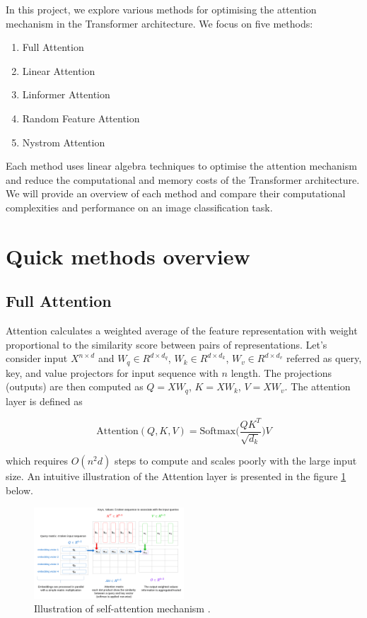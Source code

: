 In this project, we explore various methods for optimising the attention mechanism in the Transformer architecture. We focus on five methods: 
\begin{enumerate}
\item Full Attention
\item Linear Attention
\item Linformer Attention
\item Random Feature Attention
\item Nystrom Attention
\end{enumerate}
Each method uses linear algebra techniques to optimise the attention mechanism and reduce the computational and memory costs of the Transformer architecture. We will provide an overview of each method and compare their computational complexities and performance on an image classification task.


\section{Quick methods overview}

\subsection{Full Attention}

Attention calculates a weighted average of the feature representation with weight proportional to the similarity score between pairs of representations. Let’s consider input $X^{n \times d}$ and $W_q \in R^{d \times d_q}$, $W_k \in R^{d \times d_k}$, $W_v \in R^{d \times d_v}$ referred as query, key, and value projectors for input sequence with $n$ length. The projections (outputs) are then computed as $Q=XW_q$, $K=XW_k$, $V=XW_v$.
The attention layer is defined as 

$$ \text{Attention}(Q, K, V) = \text{Softmax} \big( \frac{QK^T}{\sqrt{d_k}} \big)V $$ 

which requires $O(n^2d)$ steps to compute and scales poorly with the large input size. An intuitive illustration of the Attention layer is presented in the figure \ref{fig:self-attention} below.

\begin{figure}[h]
\centering
\includegraphics[width=0.5\textwidth]{self-attention-explained.png}
\caption{\label{fig:self-attention}Illustration of self-attention mechanism \cite{self-attention-explained}.}
\end{figure}

